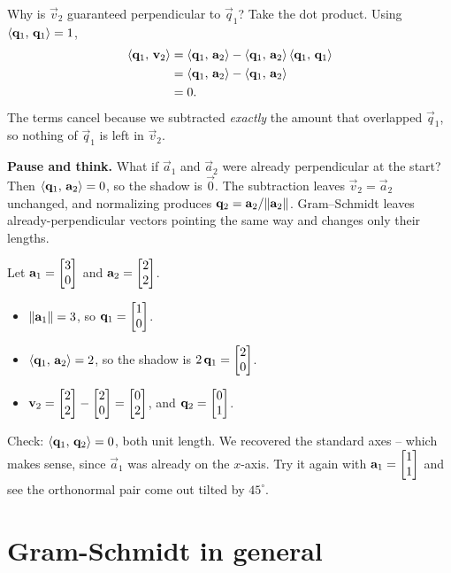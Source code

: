 Why is $\vec{v}_2$ guaranteed perpendicular to $\vec{q}_1$? Take the dot product.
Using $\langle \mathbf{q}_1,\, \mathbf{q}_1 \rangle=1$,
\begin{align*}
  \langle \mathbf{q}_1,\, \mathbf{v}_2 \rangle
   &= \langle \mathbf{q}_1,\, \mathbf{a}_2 \rangle - \langle \mathbf{q}_1,\, \mathbf{a}_2 \rangle\,\langle \mathbf{q}_1,\, \mathbf{q}_1 \rangle\\
   &= \langle \mathbf{q}_1,\, \mathbf{a}_2 \rangle - \langle \mathbf{q}_1,\, \mathbf{a}_2 \rangle\\
   &= 0.
\end{align*}
The terms cancel because we subtracted \emph{exactly} the amount that
overlapped $\vec{q}_1$, so nothing of $\vec{q}_1$ is left in $\vec{v}_2$.

\begin{recoverybox}
\textbf{Pause and think.} What if $\vec{a}_1$ and $\vec{a}_2$ were already perpendicular
at the start? Then $\langle \mathbf{q}_1,\, \mathbf{a}_2 \rangle=0$, so the shadow is $\vec{0}$. The
subtraction leaves $\vec{v}_2 = \vec{a}_2$ unchanged, and normalizing produces
$\mathbf{q}_2 = \mathbf{a}_2/\lVert\mathbf{a}_2\rVert$. Gram--Schmidt leaves already-perpendicular
vectors pointing the same way and changes only their lengths.
\end{recoverybox}

\begin{labbox}
Let $\mathbf{a}_1=\begin{bmatrix}3\\0\end{bmatrix}$ and $\mathbf{a}_2=\begin{bmatrix}2\\2\end{bmatrix}$.
\begin{itemize}
  \item $\lVert\mathbf{a}_1\rVert=3$, so $\mathbf{q}_1=\begin{bmatrix}1\\0\end{bmatrix}$.
  \item $\langle \mathbf{q}_1,\, \mathbf{a}_2 \rangle=2$, so the shadow is $2\,\mathbf{q}_1=\begin{bmatrix}2\\0\end{bmatrix}$.
  \item $\mathbf{v}_2=\begin{bmatrix}2\\2\end{bmatrix}-\begin{bmatrix}2\\0\end{bmatrix}=\begin{bmatrix}0\\2\end{bmatrix}$, and
        $\mathbf{q}_2=\begin{bmatrix}0\\1\end{bmatrix}$.
\end{itemize}
Check: $\langle \mathbf{q}_1,\, \mathbf{q}_2 \rangle=0$, both unit length. We recovered the standard
axes -- which makes sense, since $\vec{a}_1$ was already on the $x$-axis. Try it again
with $\mathbf{a}_1=\begin{bmatrix}1\\1\end{bmatrix}$ and see the orthonormal pair come out tilted by $45^\circ$.
\end{labbox}

\section{Gram-Schmidt in general}

